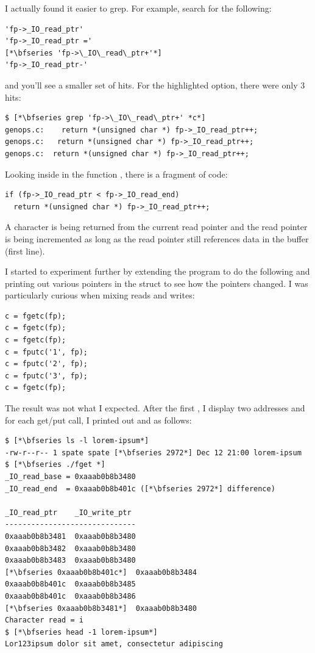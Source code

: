 \noindent
I actually found it easier to grep. For example, search for the following:

\begin{lstlisting}
'fp->_IO_read_ptr'
'fp->_IO_read_ptr ='
[*\bfseries 'fp->\_IO\_read\_ptr+'*]
'fp->_IO_read_ptr-'
\end{lstlisting}

\noindent
and you'll see a smaller set of hits. For the highlighted option, there were only 3 hits:

\begin{lstlisting}
$ [*\bfseries grep 'fp->\_IO\_read\_ptr+' *c*]
genops.c:    return *(unsigned char *) fp->_IO_read_ptr++;
genops.c:	return *(unsigned char *) fp->_IO_read_ptr++;
genops.c:  return *(unsigned char *) fp->_IO_read_ptr++;
\end{lstlisting}

\noindent
Looking inside  in the function , there is a fragment of code:

\begin{lstlisting}
if (fp->_IO_read_ptr < fp->_IO_read_end)
  return *(unsigned char *) fp->_IO_read_ptr++;
\end{lstlisting}

\noindent
A character is being returned from the current read pointer and the read pointer is being incremented as long as the read pointer still references data in the buffer (first line).

I started to experiment further by extending the program to do the following and printing out various pointers in the  struct to see how the pointers changed. I was particularly curious when mixing reads and writes:

\begin{lstlisting}
c = fgetc(fp);
c = fgetc(fp);
c = fgetc(fp);
c = fputc('1', fp);
c = fputc('2', fp);
c = fputc('3', fp);
c = fgetc(fp);
\end{lstlisting}

\noindent
The result was not what I expected. After the first , I display two addresses and for each get/put call, I printed out  and  as follows:

\begin{lstlisting}
$ [*\bfseries ls -l lorem-ipsum*]
-rw-r--r-- 1 spate spate [*\bfseries 2972*] Dec 12 21:00 lorem-ipsum
$ [*\bfseries ./fget *]
_IO_read_base = 0xaaab0b8b3480
_IO_read_end  = 0xaaab0b8b401c ([*\bfseries 2972*] difference)

_IO_read_ptr    _IO_write_ptr
------------------------------
0xaaab0b8b3481  0xaaab0b8b3480
0xaaab0b8b3482  0xaaab0b8b3480
0xaaab0b8b3483  0xaaab0b8b3480
[*\bfseries 0xaaab0b8b401c*]  0xaaab0b8b3484
0xaaab0b8b401c  0xaaab0b8b3485
0xaaab0b8b401c  0xaaab0b8b3486
[*\bfseries 0xaaab0b8b3481*]  0xaaab0b8b3480
Character read = i
$ [*\bfseries head -1 lorem-ipsum*]
Lor123ipsum dolor sit amet, consectetur adipiscing
\end{lstlisting}

